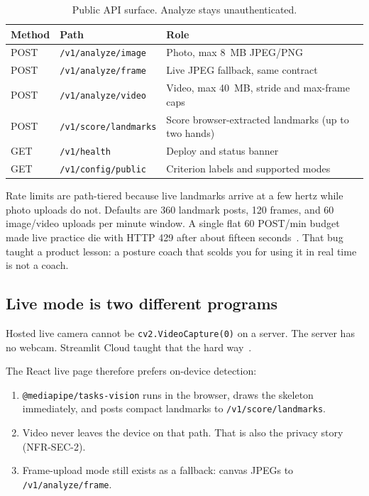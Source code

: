 \documentclass[11pt,a4paper]{article}
\newcommand{\code}[1]{\texttt{#1}}
\begin{document}
\begin{table}[ht]
\centering
\caption{Public API surface. Analyze stays unauthenticated.}
\label{tab:api}
\begin{tabularx}{\textwidth}{@{}ll>{\raggedright\arraybackslash}X@{}}
\toprule
\textbf{Method} & \textbf{Path} & \textbf{Role} \\
\midrule
POST & \code{/v1/analyze/image} & Photo, max 8~MB JPEG/PNG \\
POST & \code{/v1/analyze/frame} & Live JPEG fallback, same contract \\
POST & \code{/v1/analyze/video} & Video, max 40~MB, stride and max-frame caps \\
POST & \code{/v1/score/landmarks} & Score browser-extracted landmarks (up to two hands) \\
GET & \code{/v1/health} & Deploy and status banner \\
GET & \code{/v1/config/public} & Criterion labels and supported modes \\
\bottomrule
\end{tabularx}
\end{table}

Rate limits are path-tiered because live landmarks arrive at a few hertz while photo uploads do not.
Defaults are 360 landmark posts, 120 frames, and 60 image/video uploads per minute window.
A single flat 60 POST/min budget made live practice die with HTTP 429 after about fifteen seconds~\cite{errors}.
That bug taught a product lesson: a posture coach that scolds you for using it in real time is not a coach.

\subsection{Live mode is two different programs}

Hosted live camera cannot be \code{cv2.VideoCapture(0)} on a server.
The server has no webcam.
Streamlit Cloud taught that the hard way~\cite{errors}.

The React live page therefore prefers on-device detection:

\begin{enumerate}
  \item \code{@mediapipe/tasks-vision} runs in the browser, draws the skeleton immediately, and posts compact landmarks to \code{/v1/score/landmarks}.
  \item Video never leaves the device on that path. That is also the privacy story (NFR-SEC-2).
  \item Frame-upload mode still exists as a fallback: canvas JPEGs to \code{/v1/analyze/frame}.
\end{enumerate}
\end{document}
